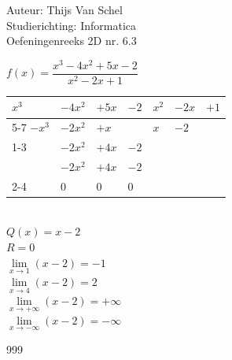 \documentclass[a4paper]{article}
\begin{document}
  
\noindent \large Auteur: Thijs Van Schel \\
\noindent \large Studierichting: Informatica\\
\noindent \large Oefeningenreeks 2D nr. 6.3\\

\medskip

\normalsize

$f(x) = \dfrac{x^3-4x^2+5x-2}{x^2-2x+1}$ \\

\begin{tabular}{llll|lll}
$x^3$ & $-4x^2$ & $+5x$ & $-2$ & $x^2$ & $-2x$ & $+1$ \\ \cline{5-7}
$-x^3$ & $-2x^2$ & $+x$ & & $x$ & $-2$ &  \\ \cline{1-3}
& $-2x^2$ & $+4x$ & $-2$ & & & \\
& $-2x^2$ & $+4x$ & $-2$ & & & \\ \cline{2-4}
& $0$ & $0$ & $0$ & & & \\
\end{tabular} \\

$Q(x) = x-2$ \\

$R = 0$ \\

$\lim\limits_{x\rightarrow1}(x-2)=-1$ \\

$\lim\limits_{x\rightarrow4}(x-2)=2$ \\

$\lim\limits_{x\rightarrow+\infty}(x-2)=+\infty$ \\

$\lim\limits_{x\rightarrow-\infty}(x-2)=-\infty$

\begin{thebibliography}{999}
\end{thebibliography}
\end{document}
